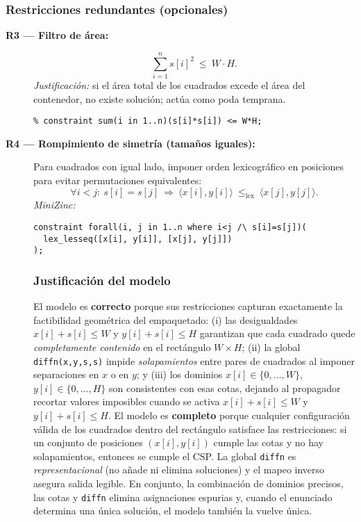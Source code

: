 \subsubsection*{Restricciones redundantes (opcionales)}
\begin{description}
  \item[\textbf{R3 — Filtro de área:}]
  \[
  \sum_{i=1}^{n} s[i]^2 \ \le\ W\cdot H.
  \]
  \textit{Justificación:} si el área total de los cuadrados excede el área del contenedor, no existe solución; actúa como poda temprana.
\begin{verbatim}
% constraint sum(i in 1..n)(s[i]*s[i]) <= W*H;
\end{verbatim}

  \item[\textbf{R4 — Rompimiento de simetría (tamaños iguales):}] Para cuadrados con igual lado, imponer orden lexicográfico en posiciones para evitar permutaciones equivalentes:
\[
\forall i<j:\ s[i]=s[j]\ \Rightarrow\ \langle x[i],y[i]\rangle\ \le_{\text{lex}}\ \langle x[j],y[j]\rangle.
\]
\textit{MiniZinc:}
\begin{verbatim}
constraint forall(i, j in 1..n where i<j /\ s[i]=s[j])(
  lex_lesseq([x[i], y[i]], [x[j], y[j]])
);
\end{verbatim}

\subsubsection*{Justificación del modelo}
El modelo es \textbf{correcto} porque sus restricciones capturan exactamente la factibilidad geométrica del empaquetado: (i) las desigualdades
\(x[i]+s[i]\le W\) y \(y[i]+s[i]\le H\) garantizan que cada cuadrado quede \emph{completamente contenido} en el rectángulo \(W\times H\); (ii) la global \texttt{diffn(x,y,s,s)} impide \emph{solapamientos} entre pares de cuadrados al imponer separaciones en \(x\) o en \(y\); y (iii) los dominios \(x[i]\in\{0,\dots,W\}\), \(y[i]\in\{0,\dots,H\}\) son consistentes con esas cotas, dejando al propagador recortar valores imposibles cuando se activa \(x[i]+s[i]\le W\) y \(y[i]+s[i]\le H\). El modelo es \textbf{completo} porque cualquier configuración válida de los cuadrados dentro del rectángulo satisface las restricciones: si un conjunto de posiciones \((x[i],y[i])\) cumple las cotas y no hay solapamientos, entonces se cumple el CSP. La global \texttt{diffn} es \emph{representacional} (no añade ni elimina soluciones) y el mapeo inverso asegura salida legible. En conjunto, la combinación de dominios precisos, las cotas y \texttt{diffn} elimina asignaciones espurias y, cuando el enunciado determina una única solución, el modelo también la vuelve única.
\end{description}